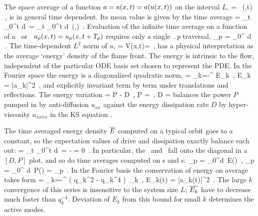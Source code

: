 The {space average} of a function $a = a(x,t) = a(u(x,t))$  on
the interval $L$,
\beq
    \expct{\obser} = \Lint{\pSpace}\, \obser(\pSpace,t)
    \,,
    \label{rpo:spac_ave}
\eeq
is in general time dependent.
Its mean value is given by the {time average}
\beq
\timeAver{\obser}
    =
\lim_{t\rightarrow \infty}  \int_0^t \! d\tau \, \expct{\obser}
    =
\lim_{t\rightarrow \infty}  \int_0^t \!
    \Lint{\tau}  d\pSpace\, \obser(\pSpace,\tau)
    \,.
\label{rpo:tim_ave}
\eeq
Evaluation of the infinite time average
 on a function of a \po\ or \rpo\
$u_p(x,t)=u_p(x,t+{T_{p}})$ requires only a single
$\period{p}$ traversal,
\beq
  \timeAver{\obser}_p = 
    \int_0^{\period{p}} \! d\tau \, \expct{\obser}
\,.
\label{rpo:u-cyc}
\eeq
The time-dependent $L^2$ norm
of $u$,
\beq
    \expctE=
  \Lint{\pSpace}
  V(x,t)=
  \Lint{\pSpace} 
  \,,
  \label{ksEnergy}
\eeq
has a physical interpretation as the average `energy'
density of the flame front.
The energy  is intrinsic to the flow,
independent of the particular ODE basis set chosen to
represent the PDE. In the Fourier
space the energy is a diagonalized quadratic norm,
\beq
\expctE
          =  \sum_{k=-\infty}^{\infty} E_k
\,,\qquad
E_k =
    {\textstyle{}}|a_k|^2
\,,
and explicitly invariant term by term under translations
and reflections.
The energy variation
\beq
   \dot{\expctE} = P - D
                \,,\qquad
      P =  
                \,,\quad
      D =  
balances the power $P$ pumped in by anti-diffusion $u_{xx}$
against the energy dissipation rate $D$
by hyper-viscosity $u_{xxxx}$
in the KS equation . %

The time averaged energy density  $\timeAver{E}$
computed on a typical orbit goes to a constant, so
the expectation values  of drive and dissipation
exactly balance each out:
\beq
      =
    \lim_{t\rightarrow \infty}
         \int_0^t d\tau \, \dot{\expctE}
=
       - 
= 0
    \,.
In particular, the \eqva\
and \reqva\ fall onto the diagonal in a $[D,P]$
plot, %
and so do time averages computed on \po s and \rpo s:
\beq
{}_p =
 \int_0^d\tau \, E(\tau)
    \,,\qquad
\timeAver{P}_p =
 \int_0^ d\tau \, P(\tau)
    =
      _p
    \,.
\label{poE}
\eeq
In the Fourier basis  the conservation of energy on average
takes form
 = \sum_{k=-\infty}^{\infty} ( q_k^2 - q_k^4 )\,
    _k
\,,\qquad
E_k(t) =  {\textstyle{}} |a_k(t)|^2
\,.
The large $k$ convergence of this series is insensitive to the
system size $L$; $\overline{E_k}$ have to decrease much faster than
$q_k^{-4}$.
Deviation of $E_k$ from this bound for small $k$ determines the active modes.


